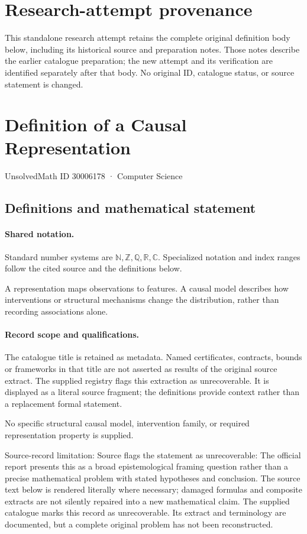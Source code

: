 \documentclass[11pt]{article}
\begin{document}
\section*{Research-attempt provenance}
This standalone research attempt retains the complete original definition body below,
including its historical source and preparation notes. Those notes describe the
earlier catalogue preparation; the new attempt and its verification are identified
separately after that body. No original ID, catalogue status, or source statement is changed.

\section{Definition of a Causal Representation}\label{30006178}
{\small UnsolvedMath ID 30006178 · Computer Science}
\subsection{Definitions and mathematical statement}

\paragraph{Shared notation.}Standard number systems are $\mathbb N,\mathbb Z,\mathbb Q,\mathbb R,\mathbb C$. Specialized notation and index ranges follow the cited source and the definitions below.


A representation maps observations to features. A causal model describes how interventions or structural mechanisms change the distribution, rather than recording associations alone.
\paragraph{Record scope and qualifications.}
The catalogue title is retained as metadata. Named certificates, contracts, bounds or frameworks in that title are not asserted as results of the original source extract.
The supplied registry flags this extraction as unrecoverable. It is displayed as a literal source fragment; the definitions provide context rather than a replacement formal statement.

No specific structural causal model, intervention family, or required representation property is supplied.

Source-record limitation: Source flags the statement as unrecoverable: The official report presents this as a broad epistemological framing question rather than a precise mathematical problem with stated hypotheses and conclusion.
The source text below is rendered literally where necessary; damaged formulas and composite extracts are not silently repaired into a new mathematical claim.
The supplied catalogue marks this record as unrecoverable. Its extract and terminology are documented, but a complete original problem has not been reconstructed.
\end{document}
